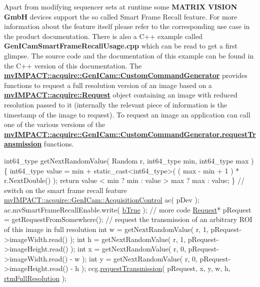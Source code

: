 Apart from modifying sequencer sets at runtime some {\bfseries M\+A\+T\+R\+I\+X V\+I\+S\+I\+O\+N Gmb\+H} devices support the so called {\ttfamily Smart Frame Recall} feature. For more information about the feature itself please refer to the corresponding use case in the product documentation. There is also a C++ example called {\bfseries Gen\+I\+Cam\+Smart\+Frame\+Recall\+Usage.\+cpp} which can be read to get a first glimpse. The source code and the documentation of this example can be found in the C++ version of this documentation. The {\bfseries \hyperlink{classmv_i_m_p_a_c_t_1_1acquire_1_1_gen_i_cam_1_1_custom_command_generator}{mv\+I\+M\+P\+A\+C\+T\+::acquire\+::\+Gen\+I\+Cam\+::\+Custom\+Command\+Generator}} provides functions to request a full resolution version of an image based on a {\bfseries \hyperlink{classmv_i_m_p_a_c_t_1_1acquire_1_1_request}{mv\+I\+M\+P\+A\+C\+T\+::acquire\+::\+Request}} object containing an image with reduced resolution passed to it (internally the relevant piece of information is the timestamp of the image to request). To request an image an application can call one of the various versions of the {\bfseries \hyperlink{classmv_i_m_p_a_c_t_1_1acquire_1_1_gen_i_cam_1_1_custom_command_generator_a12316a89a5d4925deea45c067bb7d046}{mv\+I\+M\+P\+A\+C\+T\+::acquire\+::\+Gen\+I\+Cam\+::\+Custom\+Command\+Generator.\+request\+Transmission}} functions.


\begin{DoxyCode}
int64\_type getNextRandomValue( Random r, int64\_type min, int64\_type max )
\{
  int64\_type value = min + \textcolor{keyword}{static\_cast<}int64\_type\textcolor{keyword}{>}( ( max - min + 1 ) * r.NextDouble() );
  \textcolor{keywordflow}{return} value < min ? min : value > max ? max : value;
\}
\textcolor{comment}{// switch on the smart frame recall feature}
\hyperlink{classmv_i_m_p_a_c_t_1_1acquire_1_1_gen_i_cam_1_1_acquisition_control}{mvIMPACT::acquire::GenICam::AcquisitionControl} ac( pDev );
ac.mvSmartFrameRecallEnable.write( \hyperlink{group___common_interface_gga43c995be18b0dde1eeb4a16849c58968ac2ee8a1ca7dc97f0c2792a56f94c563b}{bTrue} );
\textcolor{comment}{// more code}
\hyperlink{struct___request}{Request}* pRequest = getRequestFromSomewhere();
\textcolor{comment}{// request the transmission of an arbitrary ROI of this image in full resolution}
\textcolor{keywordtype}{int} w = getNextRandomValue( r, 1, pRequest->imageWidth.read() );
\textcolor{keywordtype}{int} h = getNextRandomValue( r, 1, pRequest->imageHeight.read() );
\textcolor{keywordtype}{int} x = getNextRandomValue( r, 0, pRequest->imageWidth.read() - w );
\textcolor{keywordtype}{int} y = getNextRandomValue( r, 0, pRequest->imageHeight.read() - h );
ccg.\hyperlink{classmv_i_m_p_a_c_t_1_1acquire_1_1_gen_i_cam_1_1_custom_command_generator_a12316a89a5d4925deea45c067bb7d046}{requestTransmission}( pRequest, x, y, w, h, 
      \hyperlink{group___gen_i_cam_interface_gga5817a4e9c4ac30a320103ae1cec95cb9aa8d28f2764e3f2869ec70d36a2ce2366}{rtmFullResolution} );
\end{DoxyCode}


